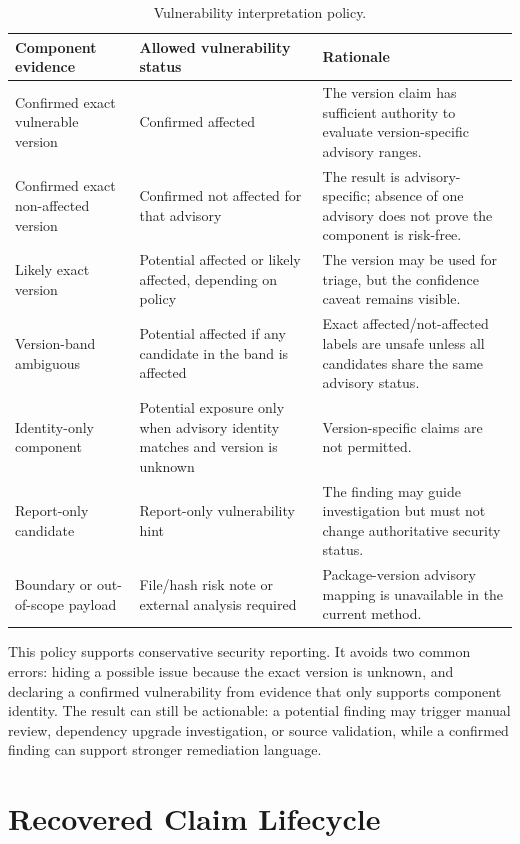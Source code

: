 \begin{table}[H]
\centering
\small
\caption{Vulnerability interpretation policy.}
\label{tab:master-vulnerability-policy}
\begin{tabularx}{\textwidth}{>{\raggedright\arraybackslash}p{}>{\raggedright\arraybackslash}p{}X}
\toprule
\textbf{Component evidence} & \textbf{Allowed vulnerability status} & \textbf{Rationale}\\
\midrule
Confirmed exact vulnerable version & Confirmed affected & The version claim
has sufficient authority to evaluate version-specific advisory ranges.\\
Confirmed exact non-affected version & Confirmed not affected for that
advisory & The result is advisory-specific; absence of one advisory does not
prove the component is risk-free.\\
Likely exact version & Potential affected or likely affected, depending on
policy & The version may be used for triage, but the confidence caveat remains
visible.\\
Version-band ambiguous & Potential affected if any candidate in the band is
affected & Exact affected/not-affected labels are unsafe unless all candidates
share the same advisory status.\\
Identity-only component & Potential exposure only when advisory identity
matches and version is unknown & Version-specific claims are not permitted.\\
Report-only candidate & Report-only vulnerability hint & The finding may guide
investigation but must not change authoritative security status.\\
Boundary or out-of-scope payload & File/hash risk note or external analysis
required & Package-version advisory mapping is unavailable in the current
method.\\
\bottomrule
\end{tabularx}
\end{table}

This policy supports conservative security reporting. It avoids two common
errors: hiding a possible issue because the exact version is unknown, and
declaring a confirmed vulnerability from evidence that only supports component
identity. The result can still be actionable: a potential finding may trigger
manual review, dependency upgrade investigation, or source validation, while a
confirmed finding can support stronger remediation language.

\section{Recovered Claim Lifecycle}


